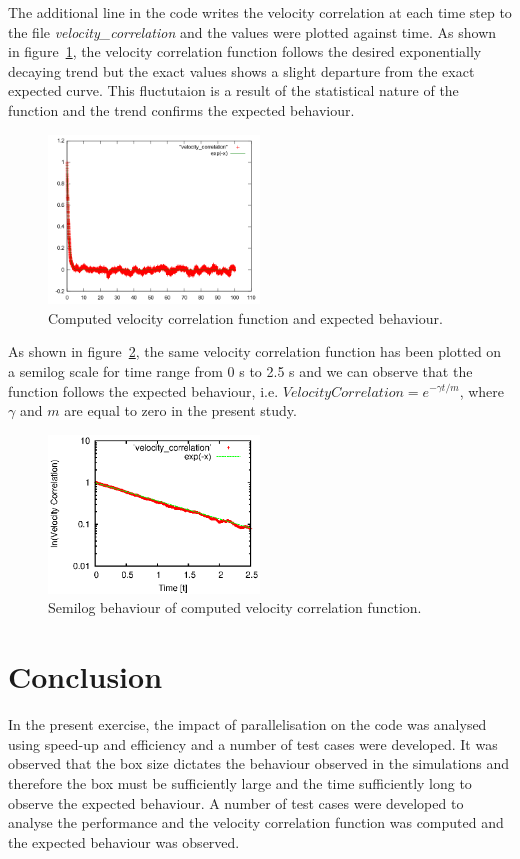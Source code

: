 \documentclass[11pt, oneside]{article}
\begin{document}
The additional line in the code writes the velocity correlation at each time step to the file \textit{velocity\_correlation} and the values were plotted against time. As shown in figure~\ref{fig:vcf}, the velocity correlation function follows the desired exponentially decaying trend but the exact values shows a slight departure from the exact expected curve. This fluctutaion is a result of the statistical nature of the function and the trend confirms the expected behaviour. 
	\begin{figure}[h]
		\centering
		\includegraphics[width=0.5\textwidth]{vcf.png}
		\caption{Computed velocity correlation function and expected behaviour.}
		\label{fig:vcf}
	\end{figure} 
        As shown in figure~\ref{fig:vcr}, the same velocity correlation function has been plotted on a semilog scale for time range from \num{0} \si{\second} to  \num{2.5} \si{\second} and we can observe that the function follows the expected behaviour, i.e. \(Velocity Correlation = e^{-\gamma t/m}\), where \(\gamma\) and \(m\) are equal to zero in the present study.
        \begin{figure}[h]
		\centering
		\includegraphics[width=0.5\textwidth]{vcr.eps}
		\caption{Semilog behaviour of computed velocity correlation function.}
		\label{fig:vcr}
	\end{figure}

\section{Conclusion}
In the present exercise, the impact of parallelisation on the code was analysed using speed-up and efficiency and a number of test cases were developed. It was observed that the box size dictates the behaviour observed in the simulations and therefore the box must be sufficiently large and the time sufficiently long to observe the expected behaviour. A number of test cases were developed to analyse the performance and the velocity correlation function was computed and the expected behaviour was observed.                  



\end{document}
